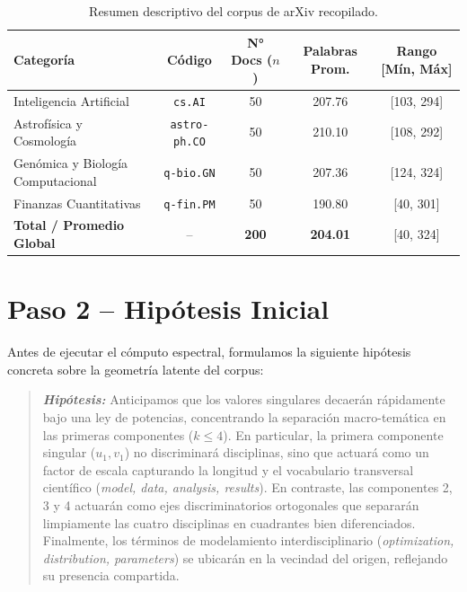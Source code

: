 \documentclass[11pt,a4paper]{article}
\begin{document}
\begin{table}[H]
\centering
\caption{Resumen descriptivo del corpus de arXiv recopilado.}
\label{tab:corpus_summary}
\begin{tabular}{lcccc}
\toprule
\textbf{Categoría} & \textbf{Código} & \textbf{N° Docs ($n$)} & \textbf{Palabras Prom.} & \textbf{Rango [Mín, Máx]} \\
\midrule
Inteligencia Artificial & \texttt{cs.AI} & 50 & 207.76 & [103, 294] \\
Astrofísica y Cosmología & \texttt{astro-ph.CO} & 50 & 210.10 & [108, 292] \\
Genómica y Biología Computacional & \texttt{q-bio.GN} & 50 & 207.36 & [124, 324] \\
Finanzas Cuantitativas & \texttt{q-fin.PM} & 50 & 190.80 & [40, 301] \\
\midrule
\textbf{Total / Promedio Global} & -- & \textbf{200} & \textbf{204.01} & [40, 324] \\
\bottomrule
\end{tabular}
\end{table}

\section{Paso 2 -- Hipótesis Inicial}
Antes de ejecutar el cómputo espectral, formulamos la siguiente hipótesis concreta sobre la geometría latente del corpus:
\begin{quote}
\textit{\textbf{Hipótesis:}}
Anticipamos que los valores singulares decaerán rápidamente bajo una ley de potencias, concentrando la separación macro-temática en las primeras componentes ($k \le 4$). En particular, la primera componente singular ($u_1, v_1$) no discriminará disciplinas, sino que actuará como un factor de escala capturando la longitud y el vocabulario transversal científico (\textit{model, data, analysis, results}). En contraste, las componentes 2, 3 y 4 actuarán como ejes discriminatorios ortogonales que separarán limpiamente las cuatro disciplinas en cuadrantes bien diferenciados. Finalmente, los términos de modelamiento interdisciplinario (\textit{optimization, distribution, parameters}) se ubicarán en la vecindad del origen, reflejando su presencia compartida.
\end{quote}
\end{document}
